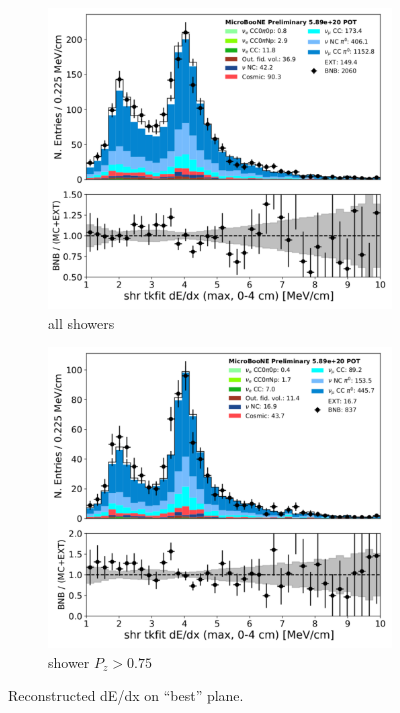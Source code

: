 \begin{figure}[H] 
\begin{center}
    \begin{subfigure}[b]{0.3\textwidth}
    \centering
    \includegraphics[width=1.00\textwidth]{pi0/calorimetry/shr_tkfit_dedx_max_03112020_ALL_scaled.pdf}
    \caption{all showers}
    \end{subfigure}
    \begin{subfigure}[b]{0.3\textwidth}
    \centering
    \includegraphics[width=1.00\textwidth]{pi0/calorimetry/shr_tkfit_dedx_max_03112020_ALL_scaled_pz075.pdf}
    \caption{shower $P_z > 0.75$}
    \end{subfigure}
\caption{Reconstructed dE/dx on ``best'' plane.}
\label{fig:pi0:calorimetry:dedxbest}
\end{center}
\end{figure}

